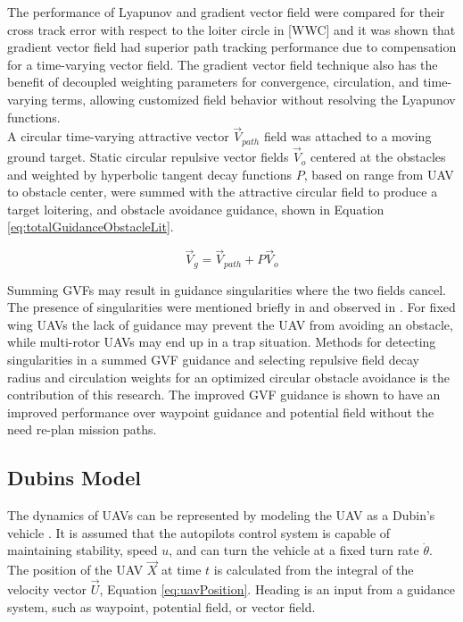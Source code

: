 \documentclass[conf]{new-aiaa}
\begin{document}
The performance of Lyapunov \cite{frew_cooperative_2007} and gradient vector field \cite{goncalves_artificial_2009,goncalves_circulation_2010,goncalves_vector_2010} were compared for their cross track error with respect to the loiter circle in [WWC] and it was shown that gradient vector field had superior path tracking performance due to compensation for a time-varying vector field. The gradient vector field technique also has the benefit of decoupled weighting parameters for convergence, circulation, and time-varying terms, allowing customized field behavior without resolving the Lyapunov functions. \\ 


A circular time-varying attractive vector $\overrightarrow{V}_{path}$ field was attached to a moving ground target. Static circular repulsive vector fields $\overrightarrow{V}_o$ centered at the obstacles and weighted by hyperbolic tangent decay functions $P$, based on range from UAV to obstacle center, were summed with the attractive circular field to produce a target loitering, and obstacle avoidance guidance, shown in Equation \ref{eq:totalGuidanceObstacleLit}.

\begin{equation}
\label{eq:totalGuidanceObstacleLit}
\overrightarrow{V}_g = \overrightarrow{V}_{path} + P\overrightarrow{V}_{o}
\end{equation}




Summing GVFs may result in guidance singularities where the two fields cancel. The presence of singularities were mentioned briefly in \cite{nelson_cooperative_2005} and observed in \cite{panagou_motion_2014}. For fixed wing UAVs the lack of guidance may prevent the UAV from avoiding an obstacle, while multi-rotor UAVs may end up in a trap situation. Methods for detecting singularities in a summed GVF guidance and selecting repulsive field decay radius and circulation weights for an optimized circular obstacle avoidance is the contribution of this research. The improved GVF guidance is shown to have an improved performance over waypoint guidance and potential field without the need re-plan mission paths. 

\subsection{Dubins Model}
The dynamics of UAVs can be represented by modeling the UAV as a Dubin's vehicle \cite{frew_cooperative_2007,griffiths_vector_2006,nelson_cooperative_2005,nelson_vector_2006,nelson_vector_2007}. It is assumed that the autopilots control system is capable of maintaining stability, speed $u$, and can turn the vehicle at a fixed turn rate $\dot{\theta}$. The position of the UAV $\overrightarrow{X}$ at time $t$ is calculated from the integral of the velocity vector $\overrightarrow{U}$, Equation \ref{eq:uavPosition}. Heading is an input from a guidance system, such as waypoint, potential field, or vector field.
\end{document}

